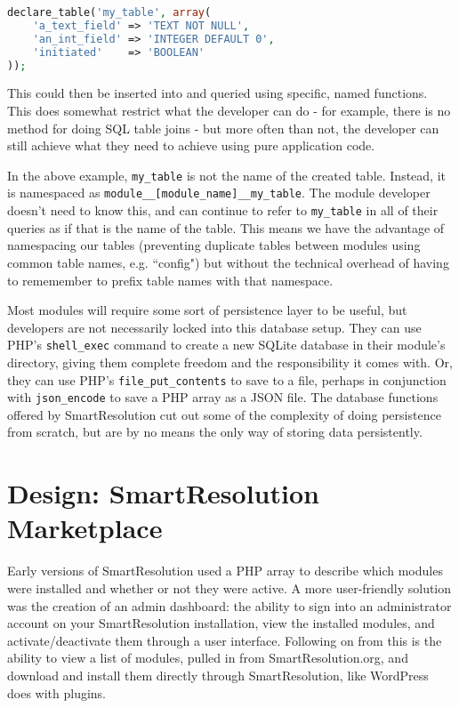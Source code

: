 \begin{lstlisting}[language=php]
declare_table('my_table', array(
    'a_text_field' => 'TEXT NOT NULL',
    'an_int_field' => 'INTEGER DEFAULT 0',
    'initiated'    => 'BOOLEAN'
));
\end{lstlisting}

This could then be inserted into and queried using specific, named functions. This does somewhat restrict what the developer can do - for example, there is no method for doing SQL table joins - but more often than not, the developer can still achieve what they need to achieve using pure application code.

In the above example, \lstinline{my_table} is not the name of the created table. Instead, it is namespaced as \lstinline{module__[module_name]__my_table}. The module developer doesn't need to know this, and can continue to refer to \lstinline{my_table} in all of their queries as if that is the name of the table. This means we have the advantage of namespacing our tables (preventing duplicate tables between modules using common table names, e.g. ``config") but without the technical overhead of having to rememember to prefix table names with that namespace.

Most modules will require some sort of persistence layer to be useful, but developers are not necessarily locked into this database setup. They can use PHP's \lstinline{shell_exec} command to create a new SQLite database in their module's directory, giving them complete freedom and the responsibility it comes with. Or, they can use PHP's \lstinline{file_put_contents} to save to a file, perhaps in conjunction with \lstinline{json_encode} to save a PHP array as a JSON file. The database functions offered by SmartResolution cut out some of the complexity of doing persistence from scratch, but are by no means the only way of storing data persistently.

\section{Design: SmartResolution Marketplace}

Early versions of SmartResolution used a PHP array to describe which modules were installed and whether or not they were active. A more user-friendly solution was the creation of an admin dashboard: the ability to sign into an administrator account on your SmartResolution installation, view the installed modules, and activate/deactivate them through a user interface. Following on from this is the ability to view a list of modules, pulled in from SmartResolution.org, and download and install them directly through SmartResolution, like WordPress does with plugins.

